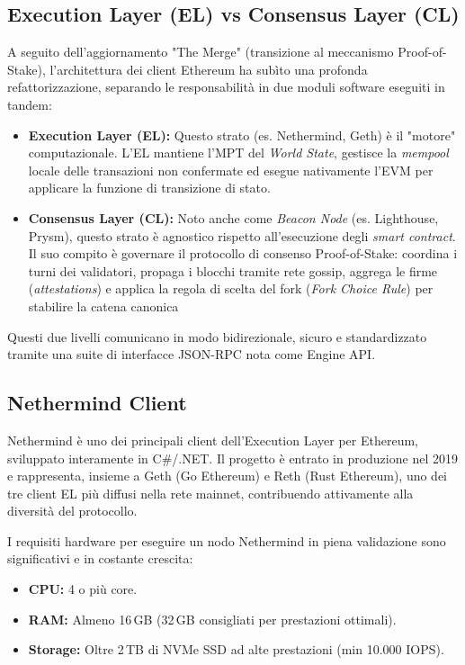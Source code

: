 \documentclass[12pt,a4paper,openright,twoside]{report}
\begin{document}
\subsection{Execution Layer (EL) vs Consensus Layer (CL)}

A seguito dell'aggiornamento "The Merge" (transizione al meccanismo Proof-of-Stake), l'architettura dei client Ethereum ha subìto una profonda refattorizzazione, separando le responsabilità in due moduli software eseguiti in tandem:
\begin{itemize}
    \item \textbf{Execution Layer (EL):} Questo strato (es. Nethermind, Geth) è il "motore" computazionale. L'EL mantiene l'MPT del \textit{World State}, gestisce la \textit{mempool} locale delle transazioni non confermate ed esegue nativamente l'EVM per applicare la funzione di transizione di stato.
    \item \textbf{Consensus Layer (CL):} Noto anche come \textit{Beacon Node} (es. Lighthouse, Prysm), questo strato è agnostico rispetto all'esecuzione degli \textit{smart contract}. Il suo compito è governare il protocollo di consenso Proof-of-Stake: coordina i turni dei validatori, propaga i blocchi tramite rete gossip, aggrega le firme (\textit{attestations}) e applica la regola di scelta del fork (\textit{Fork Choice Rule}) per stabilire la catena canonica
\end{itemize}

Questi due livelli comunicano in modo bidirezionale, sicuro e standardizzato tramite una suite di interfacce JSON-RPC nota come Engine API.

\subsection{Nethermind Client}

Nethermind è uno dei principali client dell'Execution Layer per Ethereum, sviluppato interamente in C\#/.NET. Il progetto è entrato in produzione nel 2019 e rappresenta, insieme a Geth (Go Ethereum) e Reth (Rust Ethereum), uno dei tre client EL più diffusi nella rete mainnet, contribuendo attivamente alla diversità del protocollo.

I requisiti hardware\cite{nethermind_requirements} per eseguire un nodo Nethermind in piena validazione sono significativi e in costante crescita:
\begin{itemize}
    \item \textbf{CPU:} 4 o più core.
    \item \textbf{RAM:} Almeno 16\,GB (32\,GB consigliati per prestazioni ottimali).
    \item \textbf{Storage:} Oltre 2\,TB di NVMe SSD ad alte prestazioni (min 10.000 IOPS).
\end{itemize}
\end{document}
